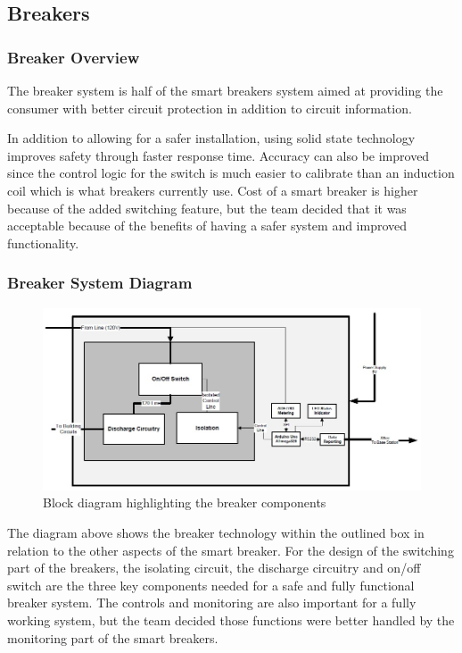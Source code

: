 \subsection{Breakers}
\subsubsection{Breaker Overview}
The breaker system is half of the smart breakers system aimed at providing the consumer with better circuit protection in addition to circuit information. 

In addition to allowing for a safer installation, using solid state technology improves safety through faster response time. Accuracy can also be improved since the control logic for the switch is much easier to calibrate than an induction coil which is what breakers currently use. Cost of a smart breaker is higher because of the added switching feature, but the team decided that it was acceptable because of the benefits of having a safer system and improved functionality.

\subsubsection{Breaker System Diagram}
\begin{figure}[htbp]
\begin{center}
\includegraphics[width=6in]{includes/NJSmartBreakerSwitch}
\caption{Block diagram highlighting the breaker components}
\label{fig:breaker_block_diagram}
\end{center}
\end{figure}

The diagram above shows the breaker technology within the outlined box in relation to the other aspects of the smart breaker. For the design of the switching part of the breakers, the isolating circuit, the discharge circuitry and on/off switch are the three key components needed for a safe and fully functional breaker system. The controls and monitoring are also important for a fully working system, but the team decided those functions were better handled by the monitoring part of the smart breakers.

